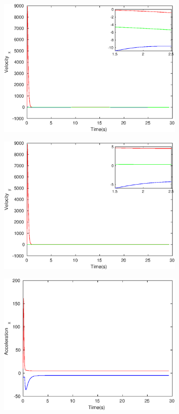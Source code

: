 \begin{figure}[h]
\begin{subfigure}{.5\linewidth}
\centering
\includegraphics[width=.9\linewidth]{figures/HInf/s3csHInfVelocity_x}
\end{subfigure}
\begin{subfigure}{.5\linewidth}
\centering
\includegraphics[width=.9\linewidth]{figures/HInf/s3csHInfVelocity_y}
\end{subfigure}
\begin{subfigure}{.5\linewidth}
\centering
\includegraphics[width=.9\linewidth]{figures/HInf/s3csHInfAcceleration_x}

\end{subfigure}
\end{figure}
